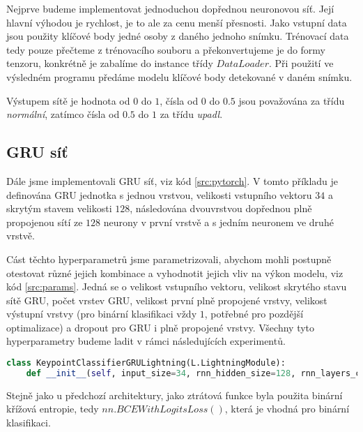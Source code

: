 Nejprve budeme implementovat jednoduchou dopřednou neuronovou síť. Její hlavní
výhodou je rychlost, je to ale za cenu menší přesnosti. Jako vstupní data jsou
použity klíčové body jedné osoby z daného jednoho snímku. Trénovací data tedy
pouze přečteme z trénovacího souboru a překonvertujeme je do formy tenzoru,
konkrétně je zabalíme do instance třídy $DataLoader$. Při použití ve výsledném
programu předáme modelu klíčové body detekované v daném snímku.


Výstupem sítě je hodnota od $0$ do $1$, čísla od $0$ do $0.5$ jsou považována
za třídu \textit{normální}, zatímco čísla od $0.5$ do $1$ za třídu
\textit{upadl}.

\subsection{GRU síť}

Dále jsme implementovali GRU síť, viz kód \ref{src:pytorch}. V tomto příkladu
je definována GRU jednotka s jednou vrstvou, velikosti vstupního vektoru $34$ a
skrytým stavem velikosti $128$, následována dvouvrstvou dopřednou plně
propojenou sítí ze $128$ neurony v první vrstvě a s jedním neuronem ve druhé
vrstvě.

Cást těchto hyperparametrů jsme parametrizovali, abychom mohli postupně
otestovat různé jejich kombinace a vyhodnotit jejich vliv na výkon modelu, viz
kód \ref{src:params}. Jedná se o velikost vstupního vektoru, velikost skrytého
stavu sítě GRU, počet vrstev GRU, velikost první plně propojené vrstvy,
velikost výstupní vrstvy (pro binární klasifikaci vždy $1$, potřebné pro
pozdější optimalizace) a dropout pro GRU i plně propojené vrstvy. Všechny tyto
hyperparametry budeme ladit v rámci následujících experimentů.

\begin{lstlisting}[language=Python, label=src:params, caption={Parametry konstruktoru třídy $KeypointClassifierGRU$ definující hyperparametry sítě}]
class KeypointClassifierGRULightning(L.LightningModule):
    def __init__(self, input_size=34, rnn_hidden_size=128, rnn_layers_count=2, fc_size=128, output_size=1, rnn_dropout=0.3, fc_dropout=0.3, device=None):
\end{lstlisting}

Stejně jako u předchozí architektury, jako ztrátová funkce byla použita binární
křížová entropie, tedy $nn.BCEWithLogitsLoss()$, která je vhodná pro binární
klasifikaci.

